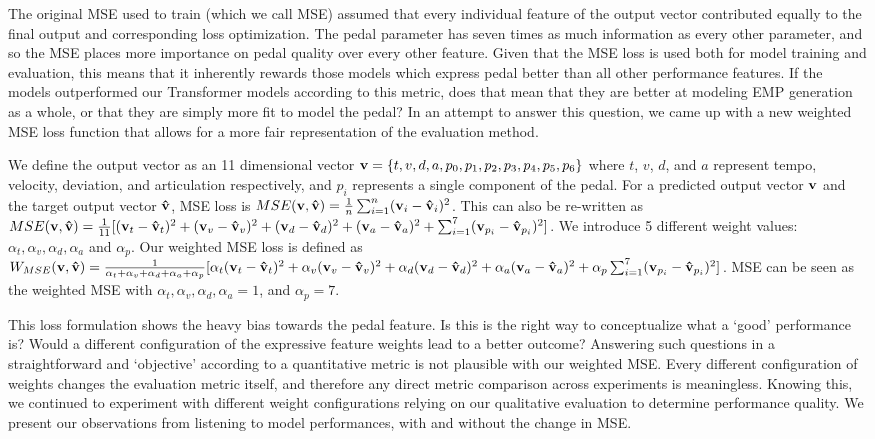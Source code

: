 The original MSE used to train \vnet{} (which we call \vnet{} MSE) assumed that every individual feature of the output vector contributed equally to the final output and corresponding loss optimization. The pedal parameter has seven times as much information as every other parameter, and so the \vnetf{} MSE places more importance on pedal quality over every other feature. Given that the \vnetf{} MSE loss is used both for model training and evaluation, this means that it inherently rewards those models which express pedal better than all other performance features. If the \vnet{} models outperformed our Transformer models according to this metric, does that mean that they are better at modeling EMP generation as a whole, or that they are simply more fit to model the pedal? In an attempt to answer this question, we came up with a new weighted MSE loss function that allows for a more fair representation of the evaluation method. 

\newcommand{\rvec}[1]{\mb{#1}}

\newcommand{\vn}{\rvec{v}}
\newcommand{\vh}{\rvec{\hat{v}}}

\newcommand{\df}[1]{(\vn_{#1} - \vh_{#1})^2}

\newcommand{\al}[1]{\alpha_{#1}}

We define the output vector as an 11 dimensional vector $\rvec{v} = \{t, v, d, a, p_0, p_1, p_2, p_3, p_4, p_5, p_6\}$ where $t$, $v$, $d$, and $a$ represent tempo, velocity, deviation, and articulation respectively, and $p_i$ represents a single component of the pedal. For a predicted output vector $\vn$ and the target output vector $\vh$, \vnetf{} MSE loss is $MSE(\vn, \vh) = \frac{1}{n}\sum_{i=1}^{n}(\vn_i - \vh_i)^2$. This can also be re-written as $MSE(\vn, \vh) = \frac{1}{11}[\df{t} + \df{v} + \df{d} + \df{a} + \sum_{i=1}^{7}(\vn_{p_{i}} - \vh_{p_{i}})^2]$. We introduce 5 different weight values: $\al{t}, \al{v}, \al{d}, \al{a}$ and $\al{p}$. Our weighted MSE loss is defined as $W_{MSE}(\vn, \vh) = \frac{1}{\al{t} + \al{v} + \al{d} + \al{a} + \al{p}}[\al{t}\df{t} + \al{v}\df{v} + \al{d}\df{d} + \al{a}\df{a} + \al{p}\sum_{i=1}^{7}(\vn_{p_{i}} - \vh_{p_{i}})^2 ]$. \vnetf{} MSE can be seen as the weighted MSE with $\al{t}, \al{v}, \al{d}, \al{a} = 1$, and $\al{p} = 7$. 

This loss formulation shows the heavy bias towards the pedal feature. Is this is the right way to conceptualize what a `good' performance is? Would a different configuration of the expressive feature weights lead to a better outcome? Answering such questions in a straightforward and `objective' according to a quantitative metric is not plausible with our weighted MSE. Every different configuration of weights changes the evaluation metric itself, and therefore any direct metric comparison across experiments is meaningless. Knowing this, we continued to experiment with different weight configurations relying on our qualitative evaluation to determine performance quality. We present our observations from listening to model performances, with and without the change in MSE. 

